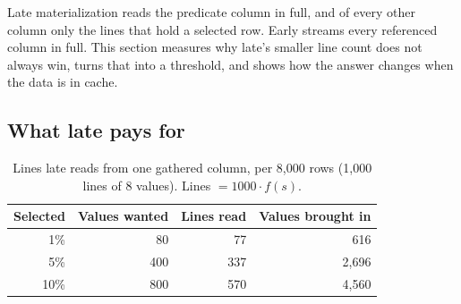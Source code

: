 
Late materialization reads the predicate column in full, and of every other column only the
lines that hold a selected row. Early streams every referenced column in full. This section
measures why late's smaller line count does not always win, turns that into a threshold, and
shows how the answer changes when the data is in cache.

\subsection{What late pays for}
\label{sec:mat:cost}

\begin{table}[t]
\centering\small
\caption{Lines late reads from one gathered column, per 8{,}000 rows (1{,}000 lines of 8
values). Lines $= 1000 \cdot f(s)$.}
\label{tab:linecount}
\begin{tabular}{rrrr}
\toprule
Selected & Values wanted & Lines read & Values brought in \\
\midrule
1\% & 80 & 77 & 616 \\
5\% & 400 & 337 & 2{,}696 \\
10\% & 800 & 570 & 4{,}560 \\
\bottomrule
\end{tabular}
\end{table}

